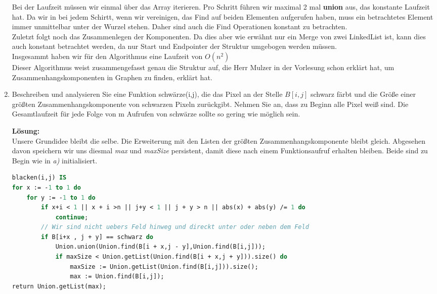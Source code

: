 \documentclass[11pt,a4paper,ngerman]{article}
\begin{document}
\begin{enumerate}[\bfseries (a)]
Bei der Laufzeit müssen wir einmal über das Array iterieren. Pro Schritt führen wir maximal 2 mal \textbf{union} aus, das konstante Laufzeit hat.  Da wir in bei jedem Schirtt, wenn wir vereinigen, das Find auf beiden Elementen aufgerufen haben, muss ein betrachtetes Element immer unmittelbar unter der Wurzel stehen. Daher sind auch die Find Operationen konstant zu betrachten.\\
Zuletzt folgt noch das Zusammenlegen der Komponenten. Da dies aber wie erwähnt nur ein Merge von zwei LinkedList ist, kann dies auch konstant betrachtet werden, da nur Start und Endpointer der Struktur umgebogen werden müssen.\\
Insgesammt haben wir für den Algorithmus eine Laufzeit von $O(n^2)$\\

Dieser Algorithmus weist zusammengefasst genau die Struktur auf, die Herr Mulzer in der Vorlesung schon erklärt hat, um Zusammenhangskomponenten in Graphen zu finden, erklärt hat.


\item Beschreiben und analysieren Sie eine Funktion schwärze(i,j), die das Pixel an der Stelle $B[i,j]$ schwarz färbt und die Größe einer größten Zusammenhangskomponente von schwarzen Pixeln zurückgibt. Nehmen Sie an, dass zu Beginn alle Pixel weiß sind. Die Gesamtlaufzeit für jede Folge von m Aufrufen von schwärze sollte so gering wie möglich sein.

\textbf{Lösung:}\\
Unsere Grundidee bleibt die selbe. Die Erweiterung mit den Listen der größten Zusammenhangskomponente bleibt gleich. Abgesehen davon speichern wir uns diesmal \emph{max} und \emph{maxSize} persistent, damit diese nach einem Funktionsaufruf erhalten bleiben.
Beide sind zu Begin wie in \emph{a)} initialisiert.\\

\begin{lstlisting}[language=Pascal]
blacken(i,j) IS
for x := -1 to 1 do
	for y := -1 to 1 do
		if x+i < 1 || x + i >n || j+y < 1 || j + y > n || abs(x) + abs(y) /= 1 do
			continue;
		// Wir sind nicht uebers Feld hinweg und direckt unter oder neben dem Feld
		if B[i+x , j + y] == schwarz do
			Union.union(Union.find(B[i + x,j - y],Union.find(B[i,j]));
			if maxSize < Union.getList(Union.find(B[i + x,j + y])).size() do				
				maxSize := Union.getList(Union.find(B[i,j])).size();
				max := Union.find(B[i,j]);
return Union.getList(max);
\end{lstlisting}


\end{enumerate}
\end{document}

